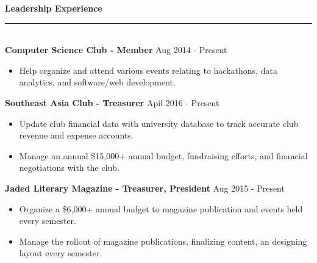 \documentclass{article}
\newcommand{\HRule}{\rule{\linewidth}{0.4mm}}
\begin{document}
\noindent
\textbf{{\Large Leadership Experience}}\\[-2mm]
\HRule\\
\noindent
\textbf{Computer Science Club - Member}
\hfill Aug 2014 - Present 
\begin{itemize}[leftmargin=*]
\vspace{-2.5mm}
\item Help organize and attend various events relating to hackathons, data analytics, and software/web development.
\end{itemize}
\vspace{-2.0mm}

\noindent
\textbf{Southeast Asia Club - Treasurer}
\hfill Apil 2016 - Present
\begin{itemize}[leftmargin=*]
\vspace{-2.5mm}
\item Update club financial data with university database to track accurate club revenue and expense accounts.
\vspace{-2.5mm}
\item Manage an annual \$15,000+ annual budget, fundraising efforts, and financial negotiations with the club.
\end{itemize}
\vspace{-2.0mm}

\noindent
\textbf{Jaded Literary Magazine - Treasurer, President}
\hfill Aug 2015 - Present
\begin{itemize}[leftmargin=*]
\vspace{-2.5mm}
\item Organize a \$6,000+ annual budget to magazine publication and events held every semester.
\vspace{-2.5mm}
\item Manage the rollout of magazine publications, finalizing content, an designing layout every semester. 
\vspace{-2.5mm}
\end{itemize}
\vspace{-2.0mm}


\end{document}
